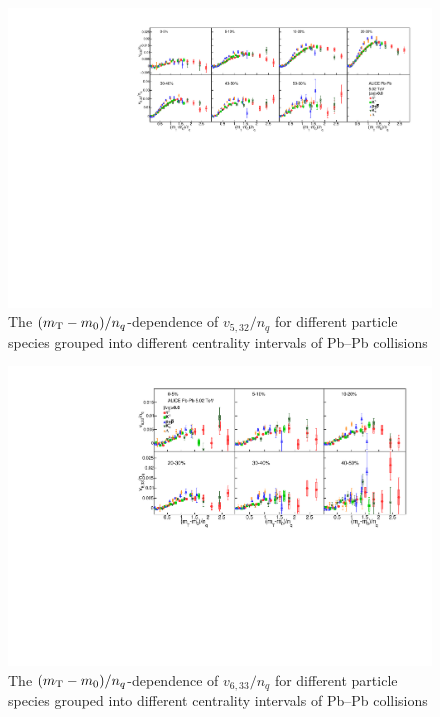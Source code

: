 \begin{figure}[htb]
\begin{center}
\includegraphics[scale=0.82]{figures/scaling/All_v523_gap00_KET.pdf}
\end{center}
\caption{The $(m_{\rm{T}} - m_{0})/n_{q}$-dependence of $v_{5,32}/n_{q}$ for different particle species grouped into different centrality intervals of Pb--Pb collisions \sNN}
\label{v523_KET}
\end{figure}

\begin{figure}[htb]
\begin{center}
\includegraphics[scale=0.62]{figures/scaling/All_v633_gap00_KET.pdf}
\end{center}
\caption{The $(m_{\rm{T}} - m_{0})/n_{q}$-dependence of $v_{6,33}/n_{q}$ for different particle species grouped into different centrality intervals of Pb--Pb collisions \sNN}
\label{v633_KET}
\end{figure}

